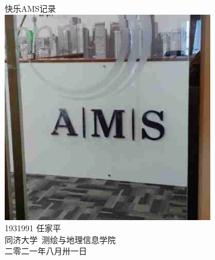 \documentclass[a4paper, 12pt]{article}
\begin{document}
\begin{center}
    {\Huge 
        快乐AMS记录}\\[20pt]
    
    \includegraphics[height=25em]{pic/cover.jpg} \\[15pt] 

    {\Large 
        1931991 任家平\\[12pt]
        同济大学~测绘与地理信息学院\\[12pt]
        二零二一年八月卅一日}
\end{center}
\thispagestyle{empty}



\newpage
{}
\tableofcontents
\newpage
{}




\listoffigures
{}
\listoftables
{}
\newpage
\nocite{*}

% 
\end{document}
